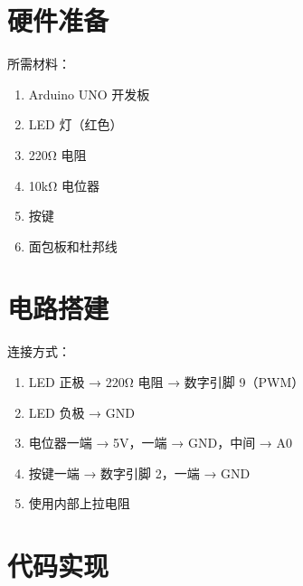 \documentclass[12pt,UTF8]{ctexbook}
\begin{document}
\section{硬件准备}

所需材料：
\begin{enumerate}
    \item Arduino UNO 开发板
    \item LED 灯（红色）
    \item 220Ω 电阻
    \item 10kΩ 电位器
    \item 按键
    \item 面包板和杜邦线
\end{enumerate}

\section{电路搭建}

连接方式：
\begin{enumerate}
    \item LED 正极 → 220Ω 电阻 → 数字引脚 9（PWM）
    \item LED 负极 → GND
    \item 电位器一端 → 5V，一端 → GND，中间 → A0
    \item 按键一端 → 数字引脚 2，一端 → GND
    \item 使用内部上拉电阻
\end{enumerate}

\section{代码实现}
\end{document}
